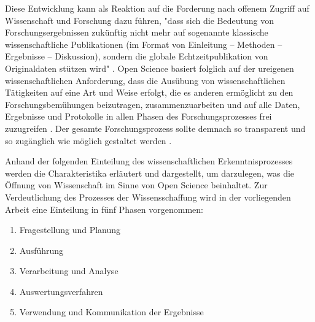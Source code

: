 Diese Entwicklung kann als Reaktion auf die Forderung nach offenem Zugriff auf Wissenschaft und Forschung dazu führen, "dass sich die Bedeutung von Forschungsergebnissen zukünftig nicht mehr auf sogenannte klassische wissenschaftliche Publikationen (im Format von Einleitung – Methoden – Ergebnisse – Diskussion), sondern die globale Echtzeitpublikation von Originaldaten stützen wird" \cite{Stengel_2013}. Open Science basiert folglich auf der ureigenen wissenschaftlichen Anforderung, dass die Ausübung von wissenschaftlichen Tätigkeiten auf eine Art und Weise erfolgt, die es anderen ermöglicht zu den Forschungsbemühungen beizutragen, zusammenzuarbeiten und auf alle Daten, Ergebnisse und Protokolle in allen Phasen des Forschungsprozesses frei zuzugreifen \cite{RIN_2010}. Der gesamte Forschungsprozess sollte demnach so transparent und so zugänglich wie möglich gestaltet werden \cite{Scheliga_2014}.

Anhand der folgenden Einteilung des wissenschaftlichen Erkenntnisprozesses werden die Charakteristika erläutert und dargestellt, um darzulegen, was die Öffnung von Wissenschaft im Sinne von Open Science beinhaltet. Zur Verdeutlichung des Prozesses der Wissensschaffung wird in der vorliegenden Arbeit eine Einteilung in fünf Phasen vorgenommen:
\begin{enumerate}
\item Fragestellung und Planung
\item Ausführung
\item Verarbeitung und Analyse
\item Auswertungsverfahren
\item Verwendung und Kommunikation der Ergebnisse
\end{enumerate}

